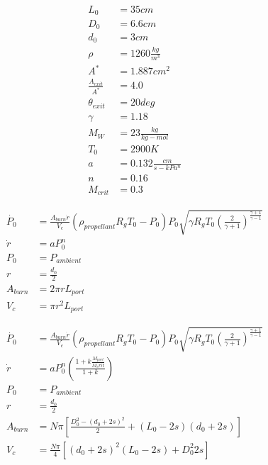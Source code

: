 \documentclass[cleanfoot,cleanhead,twocolumn,10pt,notitlepage]{asme2e}
\begin{document}
\begin{equation}
\begin{aligned}
    L_0 &= 35 cm \\
    D_0 &= 6.6 cm\\
    d_0 &= 3 cm\\
    \rho &= 1260 \frac{kg}{m^3}\\
    A^* &= 1.887 cm^2 \\
    \frac{A_{exit}}{A^*} &= 4.0 \\
    \theta_{exit} &= 20 deg \\
    \gamma &= 1.18 \\
    M_W &= 23 \frac{kg}{kg-mol}\\
    T_0 &= 2900 K\\
    a &= 0.132 \frac{cm}{s-kPa^n}\\
    n &= 0.16 \\
    M_{crit} &= 0.3
\label{eq:shared}
\end{aligned}
\end{equation}

\begin{equation}
\begin{aligned}
    \dot{P_0} &= \frac{A_{burn} \dot{r}}{V_c} 
        \left( \rho_{propellant} R_g T_0 - P_0 \right) P_0 \sqrt{\gamma R_g T_0 
        \left( \frac{2}{\gamma + 1}\right)^{\frac{\gamma+1}{\gamma-1}}} \\
    \dot{r} &= a P_0^n\\
    P_0 &= P_{ambient} \\
    r &= \frac{d_0}{2} \\ 
    A_{burn} &= 2 \pi r L_{port} \\
    V_c &= \pi r^2 L_{port} 
\label{eq:part1}
\end{aligned}
\end{equation}

\begin{equation}
\begin{aligned}
    \dot{P_0} &= \frac{A_{burn} \dot{r}}{V_c} 
        \left( \rho_{propellant} R_g T_0 - P_0 \right) P_0 \sqrt{\gamma R_g T_0 
        \left( \frac{2}{\gamma + 1}\right)^{\frac{\gamma+1}{\gamma-1}}} \\
    \dot{r} &= a P_0^n \left( \frac{1+k\frac{M_{port}}{M_crit}}{1+k} \right) \\
    P_0 &= P_{ambient} \\
    r &= \frac{d_0}{2} \\ 
    A_{burn} &= N \pi \left[ \frac{D_0^2-(d_0+2 s)^2}{2} + (L_0 - 2 s)(d_0 + 2 s)\right]\\
    V_c &= \frac{N \pi}{4} \left[ (d_0 + 2 s)^2 (L_0 - 2 s) + D_0^2 2 s \right]
\label{eq:part2}
\end{aligned}
\end{equation}
\end{document}
